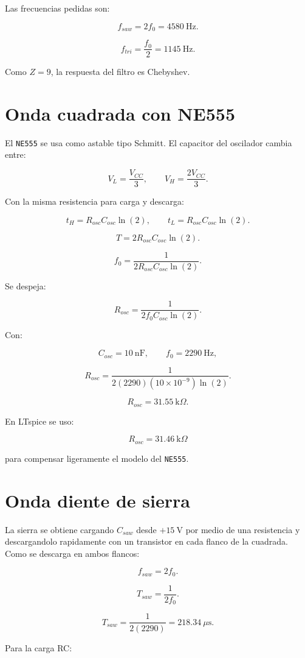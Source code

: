 \documentclass[11pt,letterpaper]{article}
\begin{document}
Las frecuencias pedidas son:

\[
f_{saw}=2f_0=4580~\text{Hz}.
\]

\[
f_{tri}=\frac{f_0}{2}=1145~\text{Hz}.
\]

Como \(Z=9\), la respuesta del filtro es Chebyshev.

\section{Onda cuadrada con NE555}

El \texttt{NE555} se usa como astable tipo Schmitt. El capacitor del oscilador
cambia entre:

\[
V_L=\frac{V_{CC}}{3},
\qquad
V_H=\frac{2V_{CC}}{3}.
\]

Con la misma resistencia para carga y descarga:

\[
t_H=R_{osc}C_{osc}\ln(2),
\qquad
t_L=R_{osc}C_{osc}\ln(2).
\]

\[
T=2R_{osc}C_{osc}\ln(2).
\]

\[
f_0=\frac{1}{2R_{osc}C_{osc}\ln(2)}.
\]

Se despeja:

\[
R_{osc}=\frac{1}{2f_0C_{osc}\ln(2)}.
\]

Con:

\[
C_{osc}=10~\text{nF},
\qquad
f_0=2290~\text{Hz},
\]

\[
R_{osc}=
\frac{1}{2(2290)(10\times10^{-9})\ln(2)}.
\]

\[
R_{osc}=31.55~\text{k}\Omega.
\]

En LTspice se uso:

\[
\boxed{R_{osc}=31.46~\text{k}\Omega}
\]

para compensar ligeramente el modelo del \texttt{NE555}.

\section{Onda diente de sierra}

La sierra se obtiene cargando \(C_{saw}\) desde \(+15~\text{V}\) por medio de
una resistencia y descargandolo rapidamente con un transistor en cada flanco de
la cuadrada. Como se descarga en ambos flancos:

\[
f_{saw}=2f_0.
\]

\[
T_{saw}=\frac{1}{2f_0}.
\]

\[
T_{saw}=\frac{1}{2(2290)}=218.34~\mu\text{s}.
\]

Para la carga RC:
\end{document}
